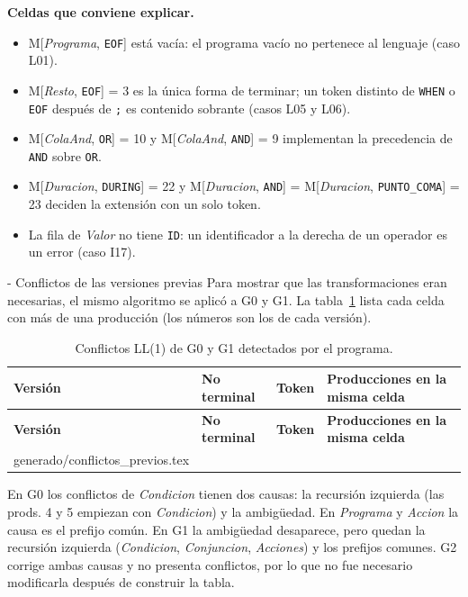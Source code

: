 \documentclass[11pt,letterpaper]{article}
\makeatletter
\renewcommand\subsection{\@startsection{subsection}{2}{\z@}{-2.6ex\@plus -1ex \@minus -.2ex}{1.0ex \@plus .2ex}%
  {\normalfont\large\bfseries}}
\newcommand{\filas}[1]{\@@input #1 }
\newcommand{\necesita}[1]{\par\penalty-100\begingroup\setlength{\dimen@}{#1}%
  \dimen@ii\pagegoal\advance\dimen@ii-\pagetotal
  \ifdim\dimen@>\dimen@ii\ifdim\dimen@ii>\z@\vfil\fi\break\fi\endgroup}
\newcommand{\T}[1]{\texttt{#1}}
\newcommand{\NT}[1]{\textit{#1}}
\newcommand{\cabeza}{\rowcolor{cabecera}}
\makeatother
\begin{document}
\textbf{Celdas que conviene explicar.}
\begin{itemize}
\item M[\NT{Programa}, \T{EOF}] está vacía: el programa vacío no pertenece al lenguaje (caso L01).
\item M[\NT{Resto}, \T{EOF}] = 3 es la única forma de terminar; un token distinto de \T{WHEN} o \T{EOF} después de
\T{;} es contenido sobrante (casos L05 y L06).
\item M[\NT{ColaAnd}, \T{OR}] = 10 y M[\NT{ColaAnd}, \T{AND}] = 9 implementan la precedencia de \T{AND} sobre \T{OR}.
\item M[\NT{Duracion}, \T{DURING}] = 22 y M[\NT{Duracion}, \T{AND}] = M[\NT{Duracion}, \T{PUNTO\_COMA}] = 23 deciden la
extensión con un solo token.
\item La fila de \NT{Valor} no tiene \T{ID}: un identificador a la derecha de un operador es un error (caso I17).
\end{itemize}

\necesita{9\baselineskip}
\subsection{Conflictos de las versiones previas}
Para mostrar que las transformaciones eran necesarias, el mismo algoritmo se aplicó a G0 y G1. La
tabla~\ref{tab:conflictos} lista cada celda con más de una producción (los números son los de cada versión).

\begin{longtable}{>{\raggedright}p{2.6cm}>{\raggedright}p{2.2cm}p{2.1cm}>{\raggedright\arraybackslash}p{8.4cm}}
\caption{Conflictos LL(1) de G0 y G1 detectados por el programa.}\label{tab:conflictos}\\
\hline\cabeza \textbf{Versión} & \textbf{No terminal} & \textbf{Token} & \textbf{Producciones en la misma celda}\\\hline\endfirsthead
\hline\cabeza \textbf{Versión} & \textbf{No terminal} & \textbf{Token} & \textbf{Producciones en la misma celda}\\\hline\endhead
\filas{generado/conflictos_previos.tex}
\hline
\end{longtable}

En G0 los conflictos de \NT{Condicion} tienen dos causas: la recursión izquierda (las prods. 4 y 5 empiezan con
\NT{Condicion}) y la ambigüedad. En \NT{Programa} y \NT{Accion} la causa es el prefijo común. En G1 la ambigüedad
desaparece, pero quedan la recursión izquierda (\NT{Condicion}, \NT{Conjuncion}, \NT{Acciones}) y los prefijos
comunes. G2 corrige ambas causas y no presenta conflictos, por lo que no fue necesario modificarla después de
construir la tabla.
\end{document}

